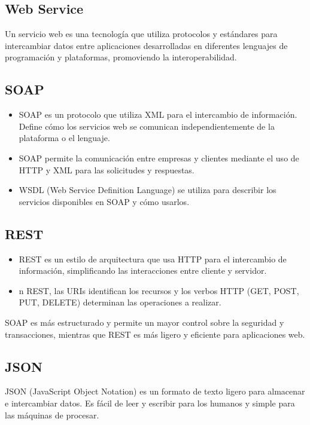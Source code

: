 \begin{center}
	\section{Web Service}

	Un servicio web es una tecnología que utiliza protocolos y estándares para intercambiar datos
	entre aplicaciones desarrolladas en diferentes lenguajes de programación y plataformas, promoviendo la interoperabilidad.

	\subsection{SOAP}
	\begin{itemize}
		\item SOAP es un protocolo que utiliza XML para el intercambio de información.
		      Define cómo los servicios web se comunican independientemente de la plataforma o el lenguaje.
		\item SOAP permite la comunicación entre empresas y clientes mediante el uso de HTTP y XML para las solicitudes y respuestas.
		\item WSDL (Web Service Definition Language) se utiliza para describir los servicios disponibles en SOAP y cómo usarlos.
	\end{itemize}

	\subsection{REST}
	\begin{itemize}
		\item REST es un estilo de arquitectura que usa HTTP para el intercambio de información, simplificando las interacciones entre cliente y servidor.
		\item n REST, las URIs identifican los recursos y los verbos HTTP (GET, POST, PUT, DELETE) determinan las operaciones a realizar.
	\end{itemize}

	SOAP es más estructurado y permite un mayor control sobre la seguridad y transacciones, mientras que REST es más ligero y eficiente para aplicaciones web.

	\subsection{JSON}
	JSON (JavaScript Object Notation) es un formato de texto ligero para almacenar e intercambiar datos. Es fácil de leer
	y escribir para los humanos y simple para las máquinas de procesar.


\end{center}

